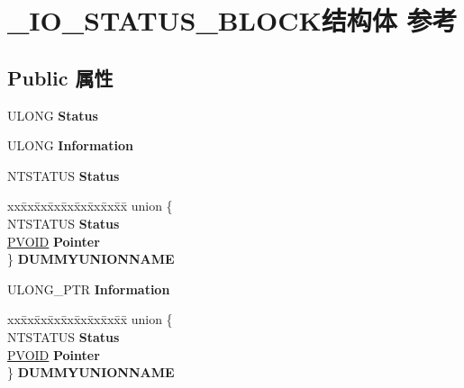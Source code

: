 \hypertarget{struct___i_o___s_t_a_t_u_s___b_l_o_c_k}{}\section{\+\_\+\+I\+O\+\_\+\+S\+T\+A\+T\+U\+S\+\_\+\+B\+L\+O\+C\+K结构体 参考}
\label{struct___i_o___s_t_a_t_u_s___b_l_o_c_k}
\subsection*{Public 属性}
\begin{DoxyCompactItemize}
\item 
\mbox{\label{struct___i_o___s_t_a_t_u_s___b_l_o_c_k_a6407cd3c0651e62cefff1462333762d1}} 
U\+L\+O\+NG {\bfseries Status}
\item 
\mbox{\label{struct___i_o___s_t_a_t_u_s___b_l_o_c_k_aa521d86b8e01d4e298bc4e9fb77cecf3}} 
U\+L\+O\+NG {\bfseries Information}
\item 
\mbox{\label{struct___i_o___s_t_a_t_u_s___b_l_o_c_k_a98a2af831f09a3521dec87991ebb2126}} 
N\+T\+S\+T\+A\+T\+US {\bfseries Status}
\item 
\mbox{\label{struct___i_o___s_t_a_t_u_s___b_l_o_c_k_a1381dcc710ca286a9ea62723bc4c3872}} 
\begin{tabbing}
xx\=xx\=xx\=xx\=xx\=xx\=xx\=xx\=xx\=\kill
union \{\\
\>NTSTATUS {\bfseries Status}\\
\>\hyperlink{interfacevoid}{PVOID} {\bfseries Pointer}\\
\} {\bfseries DUMMYUNIONNAME}\\

\end{tabbing}\item 
\mbox{\label{struct___i_o___s_t_a_t_u_s___b_l_o_c_k_aa521d86b8e01d4e298bc4e9fb77cecf3}} 
U\+L\+O\+N\+G\+\_\+\+P\+TR {\bfseries Information}
\item 
\mbox{\label{struct___i_o___s_t_a_t_u_s___b_l_o_c_k_a32655b4a5d17c845a4584bce462d86ac}} 
\begin{tabbing}
xx\=xx\=xx\=xx\=xx\=xx\=xx\=xx\=xx\=\kill
union \{\\
\>NTSTATUS {\bfseries Status}\\
\>\hyperlink{interfacevoid}{PVOID} {\bfseries Pointer}\\
\} {\bfseries DUMMYUNIONNAME}\\


\end{tabbing}
\end{DoxyCompactItemize}
